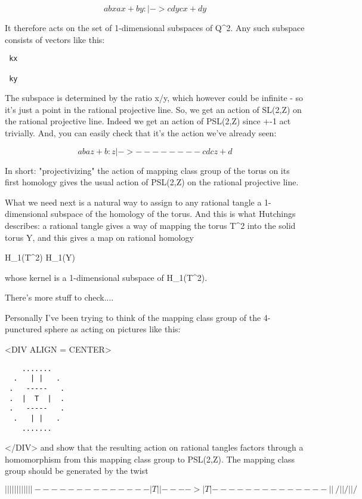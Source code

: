 $$
 a  b      x       ax + by
       :      |->     
 c  d      y       cx + dy
$$
    
It therefore acts on the set of 1-dimensional subspaces of Q^{2}.
Any such subspace consists of vectors like this:
\begin{verbatim}
 kx 

 ky 
\end{verbatim}
    
The subspace is determined by the ratio x/y, which however could be 
infinite - so it's just a point in the rational projective line.  So,
we get an action of SL(2,Z) on the rational projective line.  Indeed
we get an action of PSL(2,Z) since +-1 act trivially.  And, you can 
easily check that it's the action we've already seen:

$$
 a  b             az + b
       : z  |->  --------
 c  d             cz + d
$$
    
In short: "projectivizing" the action of mapping class group of the 
torus on its first homology gives the usual action of PSL(2,Z) on the 
rational projective line.  

What we need next is a natural way to assign to any rational tangle 
a 1-dimensional subspace of the homology of the torus.  And this is 
what Hutchings describes: a rational tangle gives a way of mapping 
the torus T^{2} into the solid torus Y, and this gives a 
map on rational homology

H_{1}(T^{2}) \to  H_{1}(Y)

whose kernel is a 1-dimensional subspace of H_{1}(T^{2}).   

There's more stuff to check....
 
Personally I've been trying to think of the mapping class group 
of the 4-punctured sphere as acting on pictures like this: 

<DIV ALIGN = CENTER>
\begin{verbatim}
    .......   
  .   | |   . 
 .   -----   .
 .  |  T  |  .
 .   -----   .
  .   | |   . 
    .......   
\end{verbatim}
    
</DIV>
and show that the resulting action on rational tangles factors
through a homomorphism from this mapping class group to PSL(2,Z).
The mapping class group should be generated by the twist 

$$
  |   |                |   |
  |   |                |   |
  |   |                |   |
 -------              -------
 |  T  |   |---->     |  T  |        
 -------              -------
  |   |                 \ /
  |   |                  / 
  |   |                 / \
$$
    
